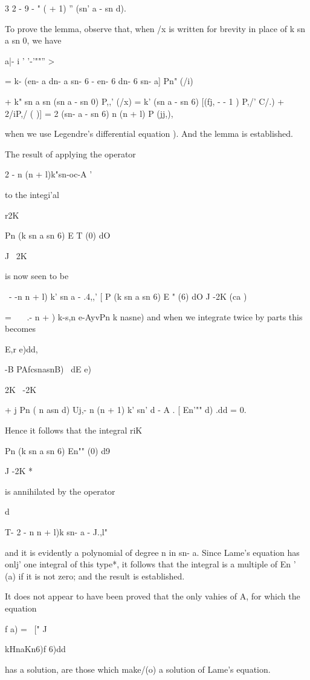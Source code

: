 {{{{{{{3 2 - 9 - " ( + 1) '' (sn' a - sn d).

To prove the lemma, observe that, when /x is written for brevity in
place of k sn a sn 0, we have

 a|- i ' '-'""'' >

= k- (en- a dn- a sn- 6 - en- 6 dn- 6 sn- a] Pn" (/i)

+ k" sn a sn (sn a - sn 0) P,,' (/x) = k' (sn a - sn 6) [(fj, - - 1 )
P,/' C/.) + 2/iP,/ ( )] = 2 (sn- a - sn 6) n (n + l) P (jj,),

when we use Legendre's differential equation ). And the lemma
is established.

The result of applying the operator

 2 - n (n + l)k"sn-oc-A '

to the integi'al

r2K

Pn (k sn a sn 6) E T (0) dO

J ~2K

is now seen to be

\ - -n n + l) k' sn a - .4,,' [ P (k sn a sn 6) E " (6) dO J -2K (ca
)

= \, \ \ .- n + ) k-s,n e-AyvPn k nasne) and when we integrate twice
by parts this becomes

E,r e)dd,

-B PAfcsnasnB) \ dE e)

2K \ -2K

+ j Pn ( n asn d) Uj,- n (n + 1) k' sn' d - A . [ En'"" d) .dd = 0.

Hence it follows that the integral riK

Pn (k sn a sn 6) En"" (0) d9

J -2K *

is annihilated by the operator

d

T- 2 - n n + l)k sn- a - J.,l"

%
%

and it is evidently a polynomial of degree n in sn- a. Since Lame's
equation has onlj' one integral of this type*, it follows that the
integral is a multiple of En ' (a) if it is not zero; and the result
is established.

It does not appear to have been proved that the only vahies of A, for
which the equation

f a) = \ [" J\ \ {kHnaKn6)f 6)dd

has a solution, are those which make/(o) a solution of Lame's
equation.

}}}}}}}}
